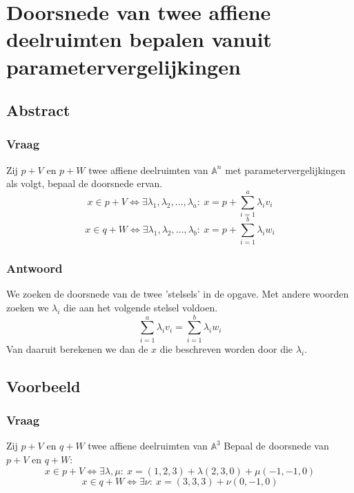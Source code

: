 \documentclass[main.tex]{subfiles}
\begin{document}
\newpage
\section{Doorsnede van twee affiene deelruimten bepalen vanuit parametervergelijkingen}
\subsection{Abstract}
\subsubsection{Vraag}
\begin{center}
  Zij $p+V$ en $p+W$ twee affiene deelruimten van $\mathbb{A}^{n}$ met parametervergelijkingen als volgt, bepaal de doorsnede ervan.
  \[ x\in p+V \Leftrightarrow \exists \lambda_{1},\lambda_{2},\dotsc,\lambda_{a}:\ x = p + \sum_{i=1}^{a}\lambda_{i}v_{i} \]
  \[ x\in q+W \Leftrightarrow \exists \lambda_{1},\lambda_{2},\dotsc,\lambda_{b}:\ x = p + \sum_{i=1}^{b}\lambda_{i}w_{i} \]
\end{center}

\subsubsection{Antwoord}
We zoeken de doorsnede van de twee 'stelsels' in de opgave.
Met andere woorden zoeken we $\lambda_{i}$ die aan het volgende stelsel voldoen.
\[ \sum_{i=1}^{a}\lambda_{i}v_{i} = \sum_{i=1}^{b}\lambda_{i}w_{i} \]
Van daaruit berekenen we dan de $x$ die beschreven worden door die $\lambda_{i}$.

\subsection{Voorbeeld}
\subsubsection{Vraag}
\begin{center}
  Zij $p+V$ en $q+W$ twee affiene deelruimten van $\mathbb{A}^{3}$ 
  Bepaal de doorsnede van $p+V$ en $q+W$:
  \[ x\in p+V \Leftrightarrow \exists \lambda, \mu:\ x = (1,2,3) + \lambda (2,3,0) + \mu (-1,-1,0) \]
  \[ x\in q+W \Leftrightarrow \exists \nu:\ x = (3,3,3) + \nu (0,-1,0) \]
\end{center}
\end{document}
